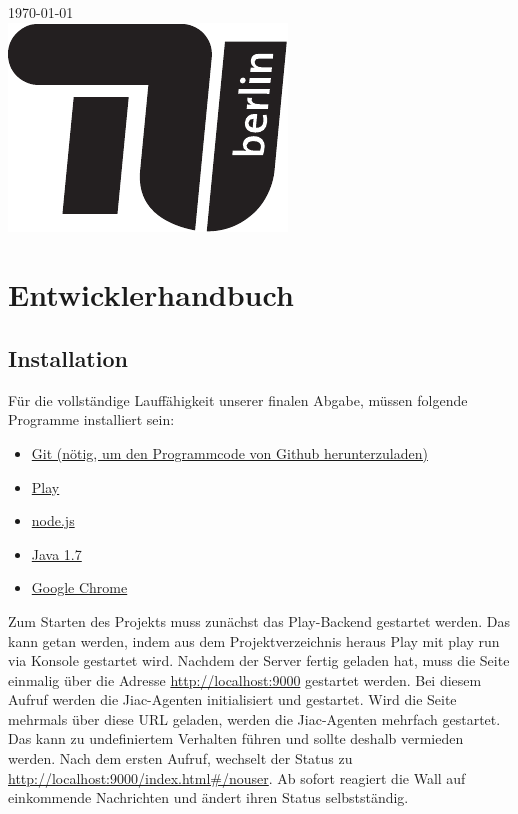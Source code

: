 \documentclass[10pt,a4paper]{report}
\newcommand{\code}[1]{{\fontfamily{cmvtt}\selectfont #1}}
\begin{document}
\begin{titlepage}

{\large \today}\\[3cm] %

\includegraphics{TU_Logo.pdf}\\[1cm] %

\vfill %
\end{titlepage}



\tableofcontents


\chapter{Entwicklerhandbuch}
	\section{Installation}
	Für die vollständige Lauffähigkeit unserer finalen Abgabe, müssen folgende Programme installiert sein:
	\begin{itemize}
		\item \href{http://github.com}{Git (nötig, um den Programmcode von Github herunterzuladen)}
		\item \href{http://www.playframework.com}{Play}
		\item \href{http://nodejs.org}{node.js}
		\item \href{http://www.oracle.com/technetwork/java/javase/downloads/java-se-jre-7-download-432155.html}{Java 1.7} 
		\item \href{http://www.google.de/intl/de/chrome/browser/}{Google Chrome}
	\end{itemize}
	Zum Starten des Projekts muss zunächst das Play-Backend gestartet werden. Das kann getan werden, indem aus dem Projektverzeichnis heraus Play mit
	\code{play run} via Konsole gestartet wird. Nachdem der Server fertig geladen hat, muss die Seite einmalig über die Adresse \url{http://localhost:9000} gestartet werden.
	Bei diesem Aufruf werden die Jiac-Agenten initialisiert und gestartet. Wird die Seite mehrmals über diese URL geladen, werden die Jiac-Agenten mehrfach gestartet. Das kann zu undefiniertem Verhalten führen und sollte deshalb vermieden werden. Nach dem ersten Aufruf, wechselt der Status zu \url{http://localhost:9000/index.html\#/nouser}. Ab sofort reagiert die Wall auf einkommende Nachrichten und ändert ihren Status selbstständig.
\end{document}
